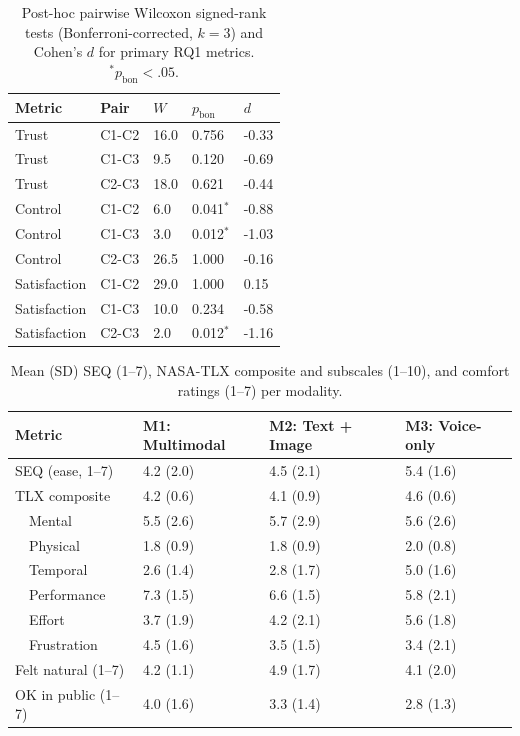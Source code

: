 \documentclass[sigconf, anonymous]{acmart}
\begin{document}
\begin{table}[h]
  \caption{Post-hoc pairwise Wilcoxon signed-rank tests (Bonferroni-corrected, $k=3$) and Cohen's $d$ for primary RQ1 metrics. $^*p_{\mathrm{bon}}<.05$.}
  \label{tab:posthoc-rq1}
  \small
  \begin{tabular}{p{} p{} p{} p{} p{}}
    \toprule
    Metric & Pair & $W$ & $p_{\mathrm{bon}}$ & $d$ \\
    \midrule
    Trust          & C1-C2    & 16.0   & 0.756 & -0.33 \\
    Trust          & C1-C3    & 9.5    & 0.120 & -0.69 \\
    Trust          & C2-C3    & 18.0   & 0.621 & -0.44 \\
    Control        & C1-C2    & 6.0    & 0.041$^*$ & -0.88 \\
    Control        & C1-C3    & 3.0    & 0.012$^*$ & -1.03 \\
    Control        & C2-C3    & 26.5   & 1.000 & -0.16 \\
    Satisfaction   & C1-C2    & 29.0   & 1.000 & 0.15 \\
    Satisfaction   & C1-C3    & 10.0   & 0.234 & -0.58 \\
    Satisfaction   & C2-C3    & 2.0    & 0.012$^*$ & -1.16 \\
    \bottomrule
  \end{tabular}
\end{table}
\begin{table}[h]
  \caption{Mean (SD) SEQ (1--7), NASA-TLX composite and subscales (1--10), and comfort ratings (1--7) per modality.}
  \label{tab:results-modality}
  \small
  \begin{tabular}{p{} p{} p{} p{}}
    \toprule
    Metric & M1: Multimodal & M2: Text + Image & M3: Voice-only \\
    \midrule
    SEQ (ease, 1--7)     & 4.2 (2.0) & 4.5 (2.1) & 5.4 (1.6) \\
    TLX composite        & 4.2 (0.6) & 4.1 (0.9) & 4.6 (0.6) \\
    ~~Mental             & 5.5 (2.6) & 5.7 (2.9) & 5.6 (2.6) \\
    ~~Physical           & 1.8 (0.9) & 1.8 (0.9) & 2.0 (0.8) \\
    ~~Temporal           & 2.6 (1.4) & 2.8 (1.7) & 5.0 (1.6) \\
    ~~Performance        & 7.3 (1.5) & 6.6 (1.5) & 5.8 (2.1) \\
    ~~Effort             & 3.7 (1.9) & 4.2 (2.1) & 5.6 (1.8) \\
    ~~Frustration        & 4.5 (1.6) & 3.5 (1.5) & 3.4 (2.1) \\
    Felt natural (1--7)  & 4.2 (1.1) & 4.9 (1.7) & 4.1 (2.0) \\
    OK in public (1--7)  & 4.0 (1.6) & 3.3 (1.4) & 2.8 (1.3) \\
    \bottomrule
  \end{tabular}
\end{table}
\end{document}
